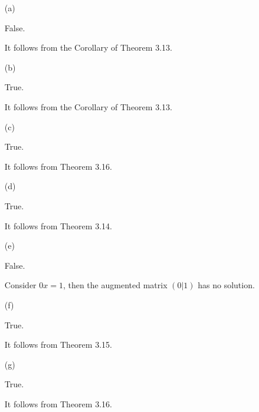 \begin{Exercise}
	\begin{enumerate}[(a)]
		\item[(a)]
		\begin{answer}
			False.
		\end{answer}
		\begin{solution}
			It follows from the Corollary of Theorem 3.13.
		\end{solution}
		
		\item[(b)]
		\begin{answer}
			True.
		\end{answer}
		\begin{solution}
			It follows from the Corollary of Theorem 3.13.
		\end{solution}
		
		\item[(c)]
		\begin{answer}
			True.
		\end{answer}
		\begin{solution}
			It follows from Theorem 3.16.
		\end{solution}
		
		\item[(d)]
		\begin{answer}
			True.
		\end{answer}
		\begin{solution}
			It follows from Theorem 3.14.
		\end{solution}
		
		\item[(e)]
		\begin{answer}
			False.
		\end{answer}
		\begin{solution}
			Consider $0x = 1$, then the augmented matrix $(0|1)$ has no solution.
		\end{solution}
		
		\item[(f)]
		\begin{answer}
			True.
		\end{answer}
		\begin{solution}
			It follows from Theorem 3.15.
		\end{solution}
		
		\item[(g)]
		\begin{answer}
			True.
		\end{answer}
		\begin{solution}
			It follows from Theorem 3.16.
		\end{solution}
		
	\end{enumerate}
\end{Exercise}